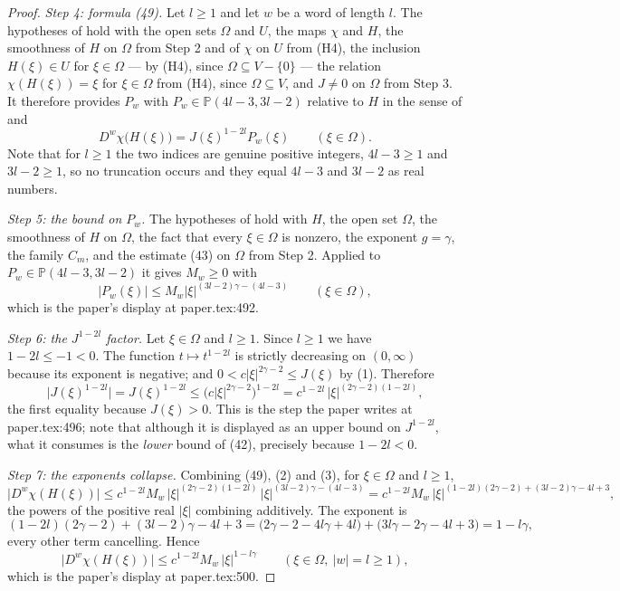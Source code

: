 \begin{proof}
\emph{Step 4: formula (49).}  Let $l\ge1$ and let $w$ be a word of length $l$.
The hypotheses of  hold with the open sets $\Omega$ and $U$,
the maps $\chi$ and $H$, the smoothness of $H$ on $\Omega$ from Step 2 and of
$\chi$ on $U$ from (H4), the inclusion $H(\xi)\in U$ for $\xi\in\Omega$ --- by
(H4), since $\Omega\subseteq V-\{0\}$ --- the relation $\chi(H(\xi))=\xi$ for
$\xi\in\Omega$ from (H4), since $\Omega\subseteq V$, and $J\neq0$ on $\Omega$
from Step 3.  It therefore provides $P_w$ with
$P_w\in\mathbb{P}(4l-3,3l-2)$ relative to $H$ in the sense of
 and
\begin{equation}\tag{49}
  D^{w}\chi\bigl(H(\xi)\bigr)=J(\xi)^{1-2l}P_w(\xi)\qquad(\xi\in\Omega).
\end{equation}
Note that for $l\ge1$ the two indices are genuine positive integers,
$4l-3\ge1$ and $3l-2\ge1$, so no truncation occurs and they equal $4l-3$ and
$3l-2$ as real numbers.

\emph{Step 5: the bound on $P_w$.}  The hypotheses of
 hold with $H$, the open set $\Omega$, the
smoothness of $H$ on $\Omega$, the fact that every $\xi\in\Omega$ is nonzero,
the exponent $g=\gamma$, the family $C_m$, and the estimate (43) on $\Omega$
from Step 2.  Applied to $P_w\in\mathbb{P}(4l-3,3l-2)$ it gives $M_w\ge0$ with
\begin{equation}\tag{2}
  \bigl|P_w(\xi)\bigr|\le M_w|\xi|^{(3l-2)\gamma-(4l-3)}\qquad(\xi\in\Omega),
\end{equation}
which is the paper's display at paper.tex:492.

\emph{Step 6: the $J^{1-2l}$ factor.}  Let $\xi\in\Omega$ and $l\ge1$.  Since
$l\ge1$ we have $1-2l\le-1<0$.  The function $t\mapsto t^{1-2l}$ is strictly
decreasing on $(0,\infty)$ because its exponent is negative; and
$0<c|\xi|^{2\gamma-2}\le J(\xi)$ by (1).  Therefore
\begin{equation}\tag{3}
  \bigl|J(\xi)^{1-2l}\bigr|=J(\xi)^{1-2l}
  \le\bigl(c|\xi|^{2\gamma-2}\bigr)^{1-2l}
  =c^{1-2l}\,|\xi|^{(2\gamma-2)(1-2l)},
\end{equation}
the first equality because $J(\xi)>0$.  This is the step the paper writes at
paper.tex:496; note that although it is displayed as an upper bound on
$J^{1-2l}$, what it consumes is the \emph{lower} bound of (42), precisely
because $1-2l<0$.

\emph{Step 7: the exponents collapse.}  Combining (49), (2) and (3), for
$\xi\in\Omega$ and $l\ge1$,
\[
  \bigl|D^{w}\chi(H(\xi))\bigr|
  \le c^{1-2l}M_w\,|\xi|^{(2\gamma-2)(1-2l)}\,|\xi|^{(3l-2)\gamma-(4l-3)}
  =c^{1-2l}M_w\,|\xi|^{(1-2l)(2\gamma-2)+(3l-2)\gamma-4l+3},
\]
the powers of the positive real $|\xi|$ combining additively.  The exponent is
\[
  (1-2l)(2\gamma-2)+(3l-2)\gamma-4l+3
  =\bigl(2\gamma-2-4l\gamma+4l\bigr)+\bigl(3l\gamma-2\gamma-4l+3\bigr)
  =1-l\gamma,
\]
every other term cancelling.  Hence
\begin{equation}\tag{4}
  \bigl|D^{w}\chi(H(\xi))\bigr|\le c^{1-2l}M_w\,|\xi|^{1-l\gamma}
  \qquad(\xi\in\Omega,\ |w|=l\ge1),
\end{equation}
which is the paper's display at paper.tex:500.


\end{proof}
